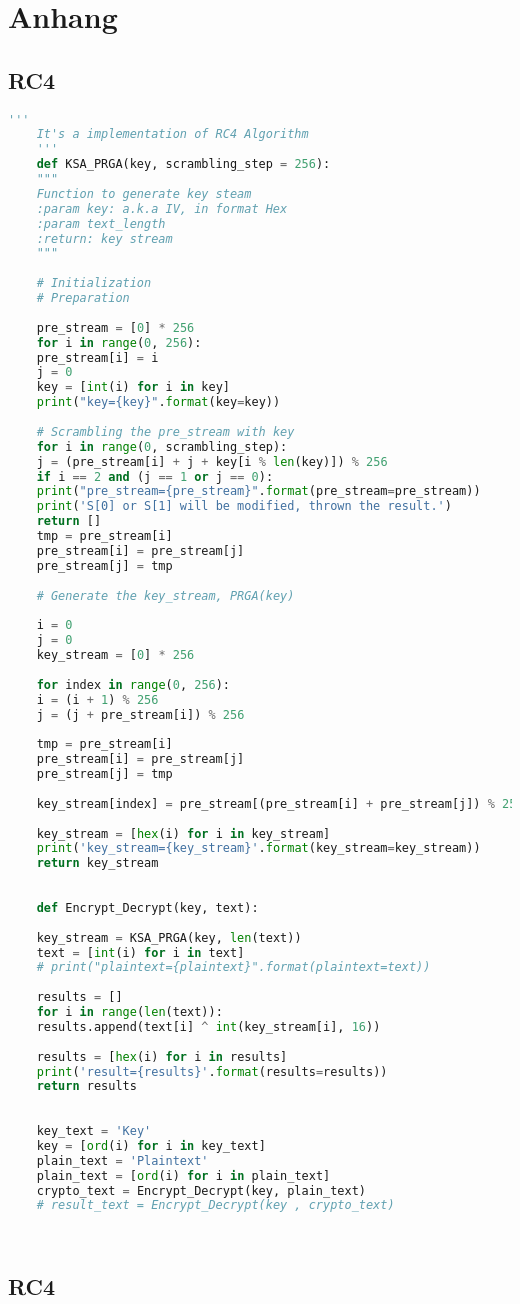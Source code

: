 \documentclass[12pt,a4paper]{article}
\begin{document}
    \section{Anhang}
    \subsection{RC4}
    \begin{lstlisting}[language=Python]
    '''
    It's a implementation of RC4 Algorithm
    '''
    def KSA_PRGA(key, scrambling_step = 256):
    """
    Function to generate key steam
    :param key: a.k.a IV, in format Hex
    :param text_length
    :return: key stream
    """
    
    # Initialization
    # Preparation
    
    pre_stream = [0] * 256
    for i in range(0, 256):
    pre_stream[i] = i
    j = 0
    key = [int(i) for i in key]
    print("key={key}".format(key=key))
    
    # Scrambling the pre_stream with key
    for i in range(0, scrambling_step):
    j = (pre_stream[i] + j + key[i % len(key)]) % 256
    if i == 2 and (j == 1 or j == 0):
    print("pre_stream={pre_stream}".format(pre_stream=pre_stream))
    print('S[0] or S[1] will be modified, thrown the result.')
    return []
    tmp = pre_stream[i]
    pre_stream[i] = pre_stream[j]
    pre_stream[j] = tmp
    
    # Generate the key_stream, PRGA(key)
    
    i = 0
    j = 0
    key_stream = [0] * 256
    
    for index in range(0, 256):
    i = (i + 1) % 256
    j = (j + pre_stream[i]) % 256
    
    tmp = pre_stream[i]
    pre_stream[i] = pre_stream[j]
    pre_stream[j] = tmp
    
    key_stream[index] = pre_stream[(pre_stream[i] + pre_stream[j]) % 256]
    
    key_stream = [hex(i) for i in key_stream]
    print('key_stream={key_stream}'.format(key_stream=key_stream))
    return key_stream
    
    
    def Encrypt_Decrypt(key, text):
    
    key_stream = KSA_PRGA(key, len(text))
    text = [int(i) for i in text]
    # print("plaintext={plaintext}".format(plaintext=text))
    
    results = []
    for i in range(len(text)):
    results.append(text[i] ^ int(key_stream[i], 16))
    
    results = [hex(i) for i in results]
    print('result={results}'.format(results=results))
    return results
    
    
    key_text = 'Key'
    key = [ord(i) for i in key_text]
    plain_text = 'Plaintext'
    plain_text = [ord(i) for i in plain_text]
    crypto_text = Encrypt_Decrypt(key, plain_text)
    # result_text = Encrypt_Decrypt(key , crypto_text)
    
    
    \end{lstlisting}
    \subsection{RC4}
\begin{lstlisting}[language=Python]

\end{lstlisting}
    
\end{document}
